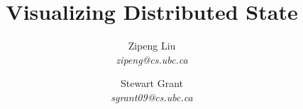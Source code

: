 \documentclass[10pt,twocolumn]{article}
\begin{document}
\title{Visualizing Distributed State}
\author{Zipeng Liu\\
    \textit{zipeng@cs.ubc.ca}
    \and
    Stewart Grant\\
    \textit{sgrant09@cs.ubc.ca}
}
\date{}
\maketitle








\balance


\end{document}
